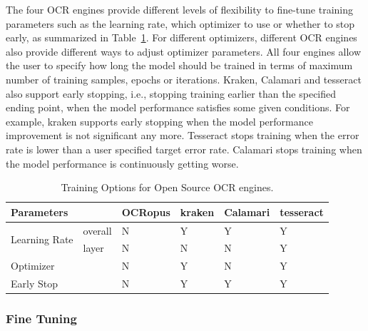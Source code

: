 \documentclass[conference]{IEEEtran}
\begin{document}
The four OCR engines provide different levels of flexibility to fine-tune training
parameters such as the learning rate, which optimizer to use or whether to stop early,
as summarized in Table~\ref{tab:training_options}. For different
optimizers, different OCR engines also provide different ways to adjust
optimizer parameters. All four engines allow the user to specify how long the
model should be trained in terms of maximum number of training samples, epochs
or iterations. Kraken, Calamari and tesseract also support early stopping,
i.e., stopping training earlier than the specified ending point, when the model
performance satisfies some given conditions. For example, kraken supports early
stopping when the model performance improvement is not significant any more. Tesseract
stops training when the error rate is lower than a user specified target error
rate. Calamari stops training when the model performance is continuously
getting worse.

\begin{table}[bt]
\begin{tabular}{llllll}
\hline
Parameters                     &         & OCRopus & kraken & Calamari & tesseract \\ \hline
\multirow{2}{*}{Learning Rate} & overall & N       & Y      & Y        & Y         \\
                               & layer   & N       & N      & N        & Y         \\
\hline
Optimizer                      &         & N       & Y      & N        & Y         \\ \hline
Early Stop                     &         & N       & Y      & Y        & Y         \\
\end{tabular}
\caption{Training Options for Open Source OCR engines.}
\label{tab:training_options}
\end{table}

\subsubsection{Fine Tuning}
\end{document}
